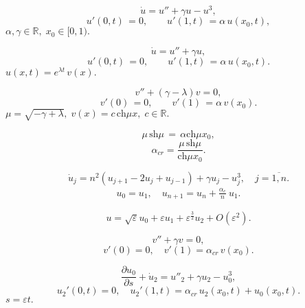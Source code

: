 \documentclass[12pt]{extarticle}
\begin{document}
\begin{equation}
	\dot u = u'' + \gamma u - u^3,	
\end{equation}
\begin{equation}
	u'(0, t) \, = 0, \qquad u'(1, t) \, = \alpha\,u(x_0, t),
\end{equation}
$ \alpha, \gamma \in \mathbb{R}, \; x_0 \in [0, 1). $

\begin{equation}
	\dot u = u'' + \gamma u,	
\end{equation}
\begin{equation}	
	u'(0, t) \, = 0, \qquad u'(1, t) \, = \alpha\,u(x_0, t).
\end{equation}
$ u(x, t) = e^{\lambda t} \, v(x). $

\begin{equation}
	v'' + (\gamma - \lambda)v = 0,	
\end{equation}
\begin{equation}	
	v'(0) \, = 0, \qquad v'(1) \, = \alpha\,v(x_0).
\end{equation}
$ \mu = \sqrt{-\gamma + \lambda}, \; v(x) = c \, \mbox{ch}  \mu x, \; c \in \mathbb{R}. $

$$ \mu \, \mbox{sh} \mu \, = \, \alpha \mbox{ch} \mu x_0 , $$
\begin{equation}
	\alpha_{cr} = \frac{\mu \, \mbox{sh} \mu}{\mbox{ch} \mu x_0}.
\end{equation}

\begin{equation} 
	\dot{u}_j =  n^2(u_{j+1} - 2u_j + u_{j-1}) + \gamma u_j - u_j^3, \quad j = \overline{1, n}. 
\end{equation}
\begin{gather}	
	u_0 = u_1, \quad u_{n+1} = u_n + \frac{\alpha_c}{n}\:u_1.
\end{gather}

\begin{equation}
	u = \sqrt{\varepsilon}u_0 + \varepsilon u_1 + \varepsilon^{\frac{3}{2}} u_2 + O(\varepsilon^2).
\end{equation}

\begin{equation}
	v'' + \gamma v = 0,
\end{equation}
\begin{equation}
	v'(0) = 0, \quad v'(1) = \alpha_{cr}\,v(x_0).
\end{equation}

\begin{equation}
	\frac{\partial u_0}{\partial s} + \dot{u}_2 = u''_2 + \gamma u_2 - u_0^3,
\end{equation}
\begin{equation}
u_2'(0, t) = 0, \quad u_2'(1, t) = \alpha_{cr}\,u_2(x_0, t) + u_0(x_0, t).
\end{equation}
$ s = \varepsilon t. $
\end{document}
